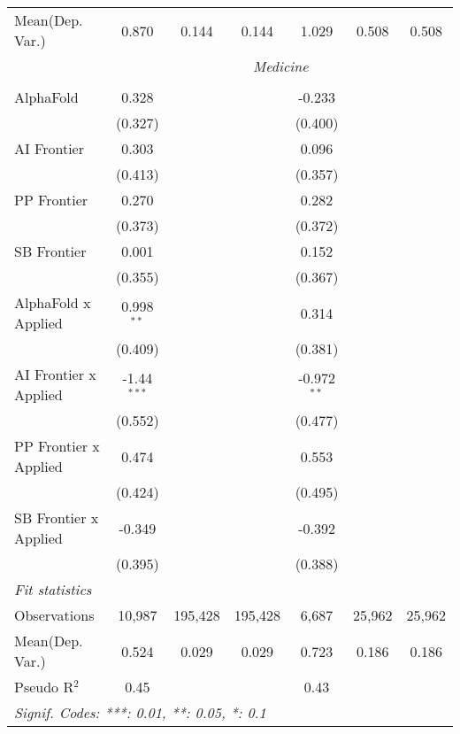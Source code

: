 \begin{tabular}{lcccccc}
Mean(Dep. Var.) & 0.870 & 0.144 & 0.144 & 1.029 & 0.508 & 0.508 \\
 & \multicolumn{6}{c}{\textit{Medicine}} \\ \\
   AlphaFold             & 0.328         &         &         & -0.233        &        &   \\   
                         & (0.327)       &         &         & (0.400)       &        &   \\   
   AI Frontier           & 0.303         &         &         & 0.096         &        &   \\   
                         & (0.413)       &         &         & (0.357)       &        &   \\   
   PP Frontier           & 0.270         &         &         & 0.282         &        &   \\   
                         & (0.373)       &         &         & (0.372)       &        &   \\   
   SB Frontier           & 0.001         &         &         & 0.152         &        &   \\   
                         & (0.355)       &         &         & (0.367)       &        &   \\   
   AlphaFold x Applied   & 0.998$^{**}$  &         &         & 0.314         &        &   \\   
                         & (0.409)       &         &         & (0.381)       &        &   \\   
   AI Frontier x Applied & -1.44$^{***}$ &         &         & -0.972$^{**}$ &        &   \\   
                         & (0.552)       &         &         & (0.477)       &        &   \\   
   PP Frontier x Applied & 0.474         &         &         & 0.553         &        &   \\   
                         & (0.424)       &         &         & (0.495)       &        &   \\   
   SB Frontier x Applied & -0.349        &         &         & -0.392        &        &   \\   
                         & (0.395)       &         &         & (0.388)       &        &   \\   
   \midrule
   \emph{Fit statistics}\\
   Observations          & 10,987        & 195,428 & 195,428 & 6,687         & 25,962 & 25,962\\  
Mean(Dep. Var.) & 0.524 & 0.029 & 0.029 & 0.723 & 0.186 & 0.186 \\
   Pseudo R$^2$          & 0.45          &         &         & 0.43          &        & \\  
   \midrule \midrule
   \multicolumn{7}{l}{\emph{Signif. Codes: ***: 0.01, **: 0.05, *: 0.1}}\\
\end{tabular}
\par\endgroup
